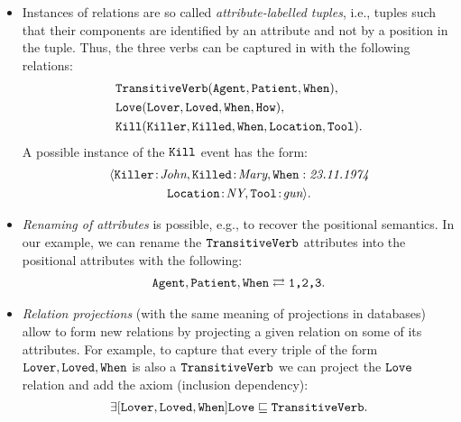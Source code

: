 \documentclass[draft]{article}
\begin{document}
\begin{itemize}
	
	\item Instances of relations are so called \emph{attribute-labelled tuples}, i.e., tuples such that their components are identified by an attribute and not by a position in the tuple. Thus, the three verbs can be captured in \DLRp with the following relations:
%
  \begin{align*}
    &{\tt TransitiveVerb (Agent, Patient, When)},\\
    &{\tt Love(Lover, Loved, When, How)},\\
    &{\tt Kill(Killer,Killed,When,Location,Tool)}.
  \end{align*}
%
A possible instance of the ${\tt Kill}$ event has the form:
%
\begin{multline*}
  \langle {\tt Killer}\!:\!\textit{John},  {\tt Killed}\!:\!
  \textit{Mary}, {\tt When}:\textit{23.11.1974}\\
    {\tt Location}\!:\!\textit{NY}, {\tt Tool}\!:\!\textit{gun}\rangle.
\end{multline*}
%
%
	\item \emph{Renaming of attributes} is possible, e.g., to recover the positional semantics. In our example, we can rename the ${\tt TransitiveVerb}$ attributes into the positional attributes with the following:
%
  \begin{align*}
  {\tt Agent, Patient, When}\rightleftarrows \texttt{1,2,3}.
  \end{align*}
%
	\item \emph{Relation projections} (with the same meaning of projections in databases) allow to form new relations by projecting a given relation on some of its attributes. For example, to capture that every triple of the form ${\tt Lover, Loved, When}$ is also a ${\tt TransitiveVerb}$ we can project the ${\tt Love}$ relation and add the axiom (inclusion dependency):
%
  \begin{align*}
    \exists [{\tt Lover, Loved,When}]\tt Love \sqsubseteq {\tt TransitiveVerb}.
  \end{align*}

\end{itemize}
\end{document}

